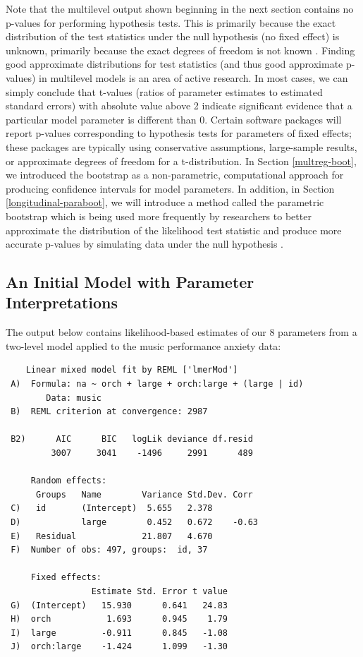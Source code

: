 \documentclass[
]{krantz}
\begin{document}
Note that the multilevel output shown beginning in the next section contains no p-values for performing hypothesis tests. This is primarily because the exact distribution of the test statistics under the null hypothesis (no fixed effect) is unknown, primarily because the exact degrees of freedom is not known \citep{Bates2015}. Finding good approximate distributions for test statistics (and thus good approximate p-values) in multilevel models is an area of active research. In most cases, we can simply conclude that t-values (ratios of parameter estimates to estimated standard errors) with absolute value above 2 indicate significant evidence that a particular model parameter is different than 0. Certain software packages will report p-values corresponding to hypothesis tests for parameters of fixed effects; these packages are typically using conservative assumptions, large-sample results, or approximate degrees of freedom for a t-distribution. In Section \ref{multreg-boot}, we introduced the bootstrap as a non-parametric, computational approach for producing confidence intervals for model parameters. In addition, in Section \ref{longitudinal-paraboot}, we will introduce a method called the parametric bootstrap which is being used more frequently by researchers to better approximate the distribution of the likelihood test statistic and produce more accurate p-values by simulating data under the null hypothesis \citep{Efron2012}.

\subsection{An Initial Model with Parameter Interpretations}\label{initialmodel}

The output below contains likelihood-based estimates of our 8 parameters from a two-level model applied to the music performance anxiety data:

\begin{verbatim}
    Linear mixed model fit by REML ['lmerMod'] 
 A)  Formula: na ~ orch + large + orch:large + (large | id) 
        Data: music 
 B)  REML criterion at convergence: 2987 
      
 B2)      AIC      BIC   logLik deviance df.resid  
         3007     3041    -1496     2991      489  
      
     Random effects: 
      Groups   Name        Variance Std.Dev. Corr  
 C)   id       (Intercept)  5.655   2.378          
 D)            large        0.452   0.672    -0.63 
 E)   Residual             21.807   4.670          
 F)  Number of obs: 497, groups:  id, 37 
      
     Fixed effects: 
                 Estimate Std. Error t value 
 G)  (Intercept)   15.930      0.641   24.83 
 H)  orch           1.693      0.945    1.79 
 I)  large         -0.911      0.845   -1.08 
 J)  orch:large    -1.424      1.099   -1.30
\end{verbatim}
\end{document}
